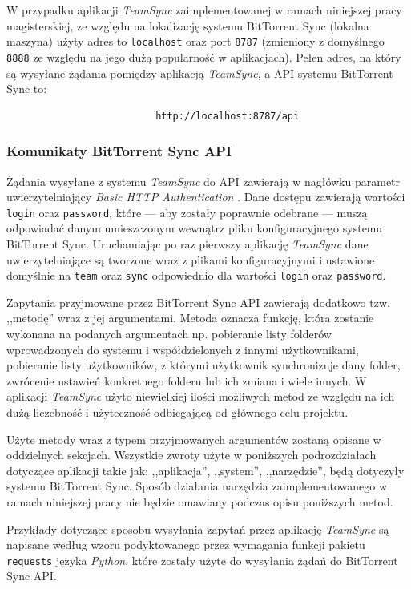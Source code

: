 \documentclass[polish,a4paper,twoside]{ppfcmthesis}
\begin{document}
W przypadku aplikacji \emph{TeamSync} zaimplementowanej w ramach niniejszej pracy magisterskiej, ze względu na lokalizację systemu BitTorrent Sync (lokalna maszyna) użyty adres to \texttt{localhost} oraz port \texttt{8787} (zmieniony z domyślnego \texttt{8888} ze względu na jego dużą popularność w aplikacjach). Pełen adres, na który są wysyłane żądania pomiędzy aplikacją \emph{TeamSync}, a API systemu BitTorrent Sync to:
\begin{verbatim}
                          http://localhost:8787/api
\end{verbatim}

\subsubsection*{Komunikaty BitTorrent Sync API}

Żądania wysyłane z systemu \emph{TeamSync} do API zawierają w nagłówku parametr uwierzytelniający \emph{Basic HTTP Authentication} \cite{basicauth}. Dane dostępu zawierają wartości \texttt{login} oraz \texttt{password}, które --- aby zostały poprawnie odebrane --- muszą odpowiadać danym umieszczonym wewnątrz pliku konfiguracyjnego systemu BitTorrent Sync. Uruchamiając po raz pierwszy aplikację \emph{TeamSync} dane uwierzytelniające są tworzone wraz z plikami konfiguracyjnymi i ustawione domyślnie na \texttt{team} oraz \texttt{sync} odpowiednio dla wartości \texttt{login} oraz \texttt{password}.

Zapytania przyjmowane przez BitTorrent Sync API zawierają dodatkowo tzw. ,,metodę'' wraz z jej argumentami. Metoda oznacza funkcję, która zostanie wykonana na podanych argumentach np. pobieranie listy folderów wprowadzonych do systemu i współdzielonych z innymi użytkownikami, pobieranie listy użytkowników, z którymi użytkownik synchronizuje dany folder, zwrócenie ustawień konkretnego folderu lub ich zmiana i wiele innych. W aplikacji \emph{TeamSync} użyto niewielkiej ilości możliwych metod ze względu na ich dużą liczebność i użyteczność odbiegającą od głównego celu projektu.

Użyte metody wraz z typem przyjmowanych argumentów zostaną opisane w oddzielnych sekcjach. Wszystkie zwroty użyte w poniższych podrozdziałach dotyczące aplikacji takie jak: ,,aplikacja'', ,,system'', ,,narzędzie'', będą dotyczyły systemu BitTorrent Sync. Sposób działania narzędzia zaimplementowanego w ramach niniejszej pracy nie będzie omawiany podczas opisu poniższych metod.

Przykłady dotyczące sposobu wysyłania zapytań przez aplikację \emph{TeamSync} są napisane według wzoru podyktowanego przez wymagania funkcji pakietu \texttt{requests} języka \emph{Python}, które zostały użyte do wysyłania żądań do BitTorrent Sync API.
\end{document}
